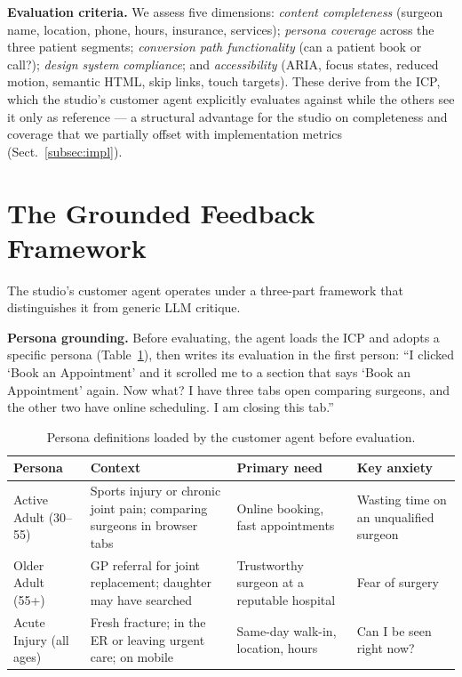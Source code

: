 \documentclass[a4paper]{llncs}
\begin{document}
\textbf{Evaluation criteria.} We assess five dimensions: \emph{content
completeness} (surgeon name, location, phone, hours, insurance, services);
\emph{persona coverage} across the three patient segments; \emph{conversion
path functionality} (can a patient book or call?); \emph{design system
compliance}; and \emph{accessibility} (ARIA, focus states, reduced motion,
semantic HTML, skip links, touch targets). These derive from the ICP, which the
studio's customer agent explicitly evaluates against while the others see it
only as reference --- a structural advantage for the studio on completeness and
coverage that we partially offset with implementation metrics
(Sect.~\ref{subsec:impl}).

\section{The Grounded Feedback Framework}
\label{sec:framework}

The studio's customer agent operates under a three-part framework that
distinguishes it from generic LLM critique.

\textbf{Persona grounding.} Before evaluating, the agent loads the ICP and
adopts a specific persona (Table~\ref{tab:persona}), then writes its evaluation
in the first person: ``I clicked `Book an Appointment' and it scrolled me to a
section that says `Book an Appointment' again. Now what? I have three tabs open
comparing surgeons, and the other two have online scheduling. I am closing this
tab.''

\begin{table}[ht]
\caption{Persona definitions loaded by the customer agent before evaluation.}
\label{tab:persona}
\centering
\footnotesize
\begin{tabular}{>{\raggedright\arraybackslash}p{1.7cm}>{\raggedright\arraybackslash}p{3.7cm}>{\raggedright\arraybackslash}p{2.6cm}>{\raggedright\arraybackslash}p{2.4cm}}
\toprule
Persona & Context & Primary need & Key anxiety \\
\midrule
Active Adult (30--55) & Sports injury or chronic joint pain; comparing
surgeons in browser tabs & Online booking, fast appointments & Wasting time
on an unqualified surgeon \\
Older Adult (55+) & GP referral for joint replacement; daughter may have
searched & Trustworthy surgeon at a reputable hospital & Fear of surgery \\
Acute Injury (all ages) & Fresh fracture; in the ER or leaving urgent care;
on mobile & Same-day walk-in, location, hours & Can I be seen right now? \\
\bottomrule
\end{tabular}
\end{table}
\end{document}
